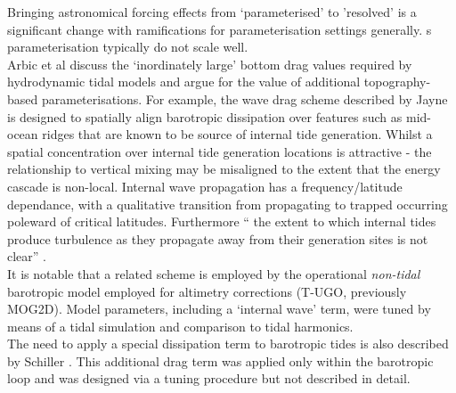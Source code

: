 Bringing astronomical forcing effects from `parameterised' to 'resolved' is a significant change with ramifications for parameterisation settings generally. \OGCM{}s parameterisation typically do not scale well.\\



Arbic et al \cite{Arbic:2004wz} discuss the `inordinately large' bottom drag values required by hydrodynamic tidal models and argue for the value of additional topography-based parameterisations.   
For example, the wave drag scheme described by Jayne \cite{Jayne:2001tr} is designed to spatially align barotropic dissipation over features such as mid-ocean ridges that are known to be source of internal tide generation.  Whilst a spatial concentration over internal tide generation locations is attractive - the relationship to vertical mixing may be misaligned to the extent that the energy cascade is non-local.  Internal wave propagation has a frequency/latitude dependance, with a qualitative transition from propagating to trapped occurring poleward of critical latitudes.  Furthermore `` the extent to which internal tides produce turbulence as they propagate away from their generation sites is not clear'' \citep[pp812]{Jayne:2001tr}.\\



It is notable that a related scheme is employed by the operational \emph{non-tidal} barotropic model employed for altimetry corrections (T-UGO, previously MOG2D)\citep{Carrere:2003cj}.  Model parameters, including a `internal wave' term, were tuned by means of a tidal simulation and comparison to tidal harmonics. \\


The need to apply a special dissipation term to barotropic tides is also described by Schiller \citep[Eq 6]{Schiller:2007gk}.   This additional drag term was applied only within the barotropic loop and was designed via a tuning procedure but not described in detail.



